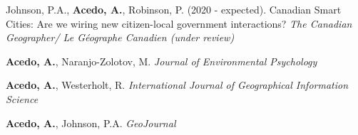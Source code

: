 
\begin{cventries}


\vspace{-4mm}

  \cventry
    {} %
    {} %
    {} %
    {} %
    {\begin{cvitems} %
        \item {Johnson, P.A., {\bf Acedo, A.}, Robinson, P. (2020 - expected). Canadian Smart Cities: Are we wiring new citizen-local government interactions? {\it The Canadian Geographer/ Le Géographe Canadien (under review)}}
      \end{cvitems}}

\vspace{-4mm}

\end{cventries}


\begin{cventries}

\vspace{-4mm}

  \cventry
    {} %
    {} %
    {} %
    {} %
    {\begin{cvitems} %
        \item {{\bf Acedo, A.}, Naranjo-Zolotov, M. {\it Journal of Environmental Psychology}}
      \end{cvitems}}

\vspace{-4mm}

  \cventry
    {} %
    {} %
    {} %
    {} %
    {\begin{cvitems} %
        \item {{\bf Acedo, A.}, Westerholt, R. {\it International Journal of Geographical Information Science}}
      \end{cvitems}}

\vspace{-4mm}

  \cventry
    {} %
    {} %
    {} %
    {} %
    {\begin{cvitems} %
        \item {{\bf Acedo, A.}, Johnson, P.A. {\it GeoJournal}}
      \end{cvitems}}

\vspace{-4mm}

\end{cventries}
